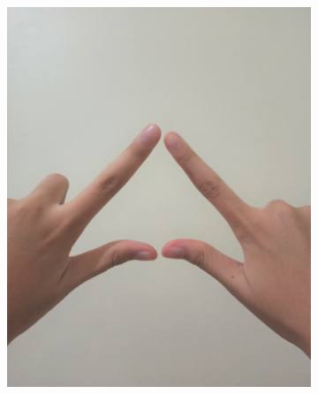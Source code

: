 \documentclass[conference]{IEEEtran}
\begin{document}
\begin{figure} [h]
\begin{center}
\begin{subfigure}[t]{0.11\textwidth}
				\includegraphics[width=\textwidth]{img/pola7.jpg}
				\caption{\label{fig:gs7}}
			\end{subfigure}
			\hspace{0.1em}
			\begin{subfigure}[t]{0.11\textwidth}
				\centering

\end{subfigure}
\end{center}
\end{figure}
\end{document}
